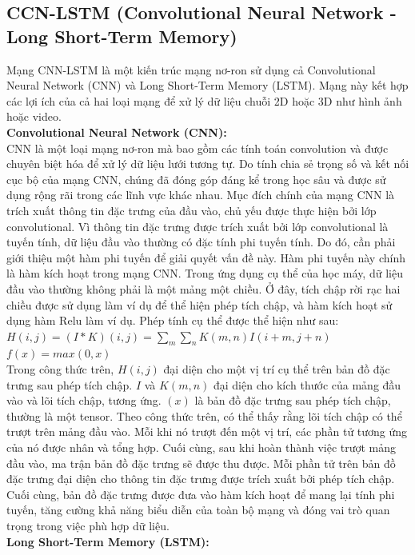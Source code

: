 \documentclass[conference]{IEEEtran}
\begin{document}
\subsection{CCN-LSTM (Convolutional Neural Network - Long Short-Term Memory)}
Mạng CNN-LSTM là một kiến trúc mạng nơ-ron sử dụng cả Convolutional Neural Network (CNN) và Long Short-Term Memory (LSTM). Mạng này kết hợp các lợi ích của cả hai loại mạng để xử lý dữ liệu chuỗi 2D hoặc 3D như hình ảnh hoặc video.\\
\textbf{Convolutional Neural Network (CNN):}\\
CNN là một loại mạng nơ-ron mà bao gồm các tính toán convolution và được chuyên biệt hóa để xử lý dữ liệu lưới tương tự. Do tính chia sẻ trọng số và kết nối cục bộ của mạng CNN, chúng đã đóng góp đáng kể trong học sâu và được sử dụng rộng rãi trong các lĩnh vực khác nhau. Mục đích chính của mạng CNN là trích xuất thông tin đặc trưng của đầu vào, chủ yếu được thực hiện bởi lớp convolutional. Vì thông tin đặc trưng được trích xuất bởi lớp convolutional là tuyến tính, dữ liệu đầu vào thường có đặc tính phi tuyến tính. Do đó, cần phải giới thiệu một hàm phi tuyến để giải quyết vấn đề này. Hàm phi tuyến này chính là hàm kích hoạt trong mạng CNN. Trong ứng dụng cụ thể của học máy, dữ liệu đầu vào thường không phải là một mảng một chiều. Ở đây, tích chập rời rạc hai chiều được sử dụng làm ví dụ để thể hiện phép tích chập, và hàm kích hoạt sử dụng hàm Relu làm ví dụ. Phép tính cụ thể được thể hiện như sau:\\
$H(i,j) = (I*K)(i,j) = \sum_{m}\sum_{n} K(m,n)I(i+m, j+n)$\\
$f(x) = max(0,x)$\\
Trong công thức trên, $H(i,j)$ đại diện cho một vị trí cụ thể trên bản đồ đặc trưng sau phép tích chập. $I$ và $K(m,n)$ đại diện cho kích thước của mảng đầu vào và lõi tích chập, tương ứng. $(x)$ là bản đồ đặc trưng sau phép tích chập, thường là một tensor. Theo công thức trên, có thể thấy rằng lõi tích chập có thể trượt trên mảng đầu vào. Mỗi khi nó trượt đến một vị trí, các phần tử tương ứng của nó được nhân và tổng hợp. Cuối cùng, sau khi hoàn thành việc trượt mảng đầu vào, ma trận bản đồ đặc trưng sẽ được thu được. Mỗi phần tử trên bản đồ đặc trưng đại diện cho thông tin đặc trưng được trích xuất bởi phép tích chập. Cuối cùng, bản đồ đặc trưng được đưa vào hàm kích hoạt để mang lại tính phi tuyến, tăng cường khả năng biểu diễn của toàn bộ mạng và đóng vai trò quan trọng trong việc phù hợp dữ liệu.\\
\textbf{Long Short-Term Memory (LSTM):}\\
\end{document}

